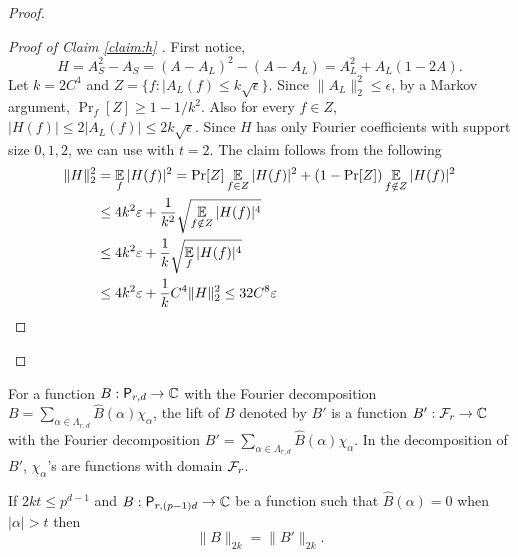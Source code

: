 \begin{proof}
\begin{proof}[Proof of Claim \ref{claim:h} ]
First notice,
$$H = A_S^2 - A_S = (A-A_L)^2- (A-A_L) = A_L^2 +A_L(1-2A).$$
Let $k=2C^4$ and $Z = \{f : | A_L(f) \leq k \sqrt{\epsilon}\}$. Since $\|A_L\|_2^2 \leq \epsilon$,
by a Markov argument, $\Pr_f[Z] \geq 1- 1/k^2$.  Also for every $f \in Z$,
$|H(f)| \leq 2 |A_L(f)| \leq 2k \sqrt{\epsilon}$. Since $H$ has only Fourier coefficients
with support size $0,1,2$, we can use  with $t=2$. The claim follows from
the following
\begin{align*}
\|H\|_2^2 &= \operatorname*{\mathbb E}_f |H(f)|^2 = \Pr[Z] \operatorname*{\mathbb E}_{f \in Z} |H(f)|^2   + (1-\Pr[Z]) \operatorname*{\mathbb E}_{f \notin Z} |H(f)|^2\\
&\leq 4k^2\varepsilon + \frac{1}{k^2} \sqrt{\operatorname*{\mathbb E}_{f \notin Z} |H(f)|^4}\\
&\leq 4k^2\varepsilon + \frac{1}{k} \sqrt{\operatorname*{\mathbb E}_{f} |H(f)|^4}\\
&\leq 4k^2\varepsilon + \frac{1}{k} C^4 \|H\|_2^2 \leq 32C^8\varepsilon
\end{align*}
\end{proof}

\end{proof}
\begin{definition}[Lift]\label{def:lift} For a function $B:\mathsf P_{r,d}
\rightarrow \mathbb C$ with the Fourier decomposition $B= \sum_{\alpha \in
\Lambda_{r,d}} \widehat{B}(\alpha) \chi_\alpha$, the lift of $B$ denoted by $B'$
is a function $B':\mathcal{F}_r \rightarrow \mathbb C$ with the Fourier decomposition $B'=
\sum_{\alpha \in \Lambda_{r,d}} \widehat{B}(\alpha) \chi_\alpha$. In the
decomposition of $B'$, $\chi_\alpha$'s are functions with domain $\mathcal{F}_r$.
\end{definition} 
\begin{lemma} \label{thm:mov-to-poly} 
If $2kt \leq p^{d-1}$ and
$B:\mathsf P_{r,(p-1)d} \rightarrow \mathbb C$ be a function such that $\widehat B(\alpha) = 0$
when $|\alpha| > t$ then 
$$\|B\|_{2k} = \|B'\|_{2k}.$$ 
\end{lemma} 
